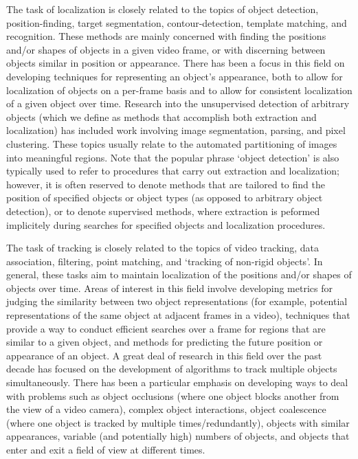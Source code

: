 \documentclass{article}
\begin{document}
The task of localization is closely related to the topics of object detection, position-finding, target segmentation, contour-detection, template matching, and recognition. These methods are mainly concerned with finding the positions and/or shapes of objects in a given video frame, or with discerning between objects similar in position or appearance. There has been a focus in this field on developing techniques for representing an object's appearance, both to allow for localization of objects on a per-frame basis and to allow for consistent localization of a given object over time. Research into the unsupervised detection of arbitrary objects (which we define as methods that accomplish both extraction and localization) has included work involving image segmentation, parsing, and pixel clustering. These topics usually relate to the automated partitioning of images into meaningful regions. Note that the popular phrase `object detection' is also typically used to refer to procedures that carry out extraction and localization; however, it is often reserved to denote methods that are tailored to find the position of specified objects or object types (as opposed to arbitrary object detection), or to denote supervised methods, where extraction is peformed implicitely during searches for specified objects and localization procedures.

The task of tracking is closely related to the topics of video tracking, data association, filtering, point matching, and `tracking of non-rigid objects'. In general, these tasks aim to maintain localization of the positions and/or shapes of objects over time. Areas of interest in this field involve developing metrics for judging the similarity between two object representations (for example, potential representations of the same object at adjacent frames in a video), techniques that provide a way to conduct efficient searches over a frame for regions that are similar to a given object, and methods for predicting the future position or appearance of an object. A great deal of research in this field over the past decade has focused on the development of algorithms to track multiple objects simultaneously. There has been a particular emphasis on developing ways to deal with problems such as object occlusions (where one object blocks another from the view of a video camera), complex object interactions, object coalescence (where one object is tracked by multiple times/redundantly), objects with similar appearances, variable (and potentially high) numbers of objects, and objects that enter and exit a field of view at different times.
\end{document}
